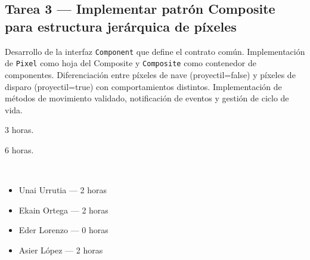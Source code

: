 \documentclass[12pt, a4paper]{article}
\begin{document}
\vspace{0.8em}

\subsection*{Tarea 3 — Implementar patrón Composite para estructura jerárquica de píxeles}
\begin{description}[leftmargin=2em, style=nextline]
    \item[\textbf{Descripción:}] Desarrollo de la interfaz \texttt{Component} que define el contrato común. Implementación de \texttt{Pixel} como hoja del Composite y \texttt{Composite} como contenedor de componentes. Diferenciación entre píxeles de nave (proyectil=false) y píxeles de disparo (proyectil=true) con comportamientos distintos. Implementación de métodos de movimiento validado, notificación de eventos y gestión de ciclo de vida.
    \item[\textbf{Tiempo estimado:}] 3 horas.
    \item[\textbf{Tiempo real:}] 6 horas.
    \item[\textbf{Responsables y dedicación:}]~
        \begin{itemize}[leftmargin=1em, nosep]
            \item Unai Urrutia — 2 horas
            \item Ekain Ortega — 2 horas
            \item Eder Lorenzo — 0 horas
            \item Asier López — 2 horas
        \end{itemize}
\end{description}

\vspace{0.8em}

\end{document}
